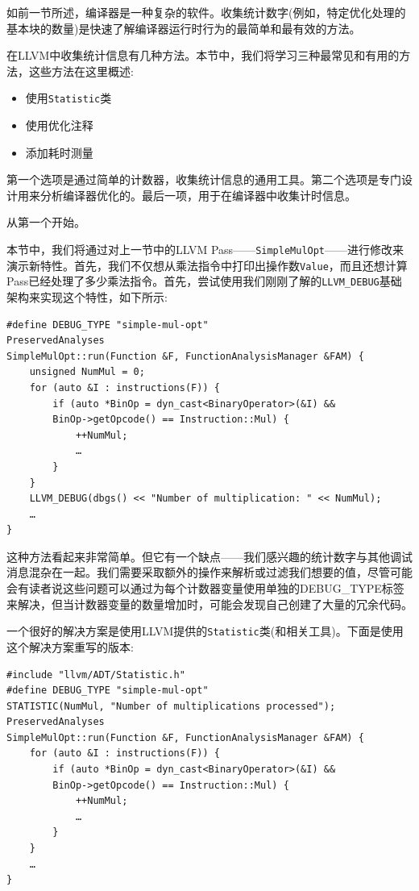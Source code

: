 
如前一节所述，编译器是一种复杂的软件。收集统计数字(例如，特定优化处理的基本块的数量)是快速了解编译器运行时行为的最简单和最有效的方法。

在LLVM中收集统计信息有几种方法。本节中，我们将学习三种最常见和有用的方法，这些方法在这里概述:

\begin{itemize}
\item 使用\texttt{Statistic}类
\item 使用优化注释
\item 添加耗时测量
\end{itemize}

第一个选项是通过简单的计数器，收集统计信息的通用工具。第二个选项是专门设计用来分析编译器优化的。最后一项，用于在编译器中收集计时信息。

从第一个开始。


本节中，我们将通过对上一节中的LLVM Pass——\texttt{SimpleMulOpt}——进行修改来演示新特性。首先，我们不仅想从乘法指令中打印出操作数\texttt{Value}，而且还想计算Pass已经处理了多少乘法指令。首先，尝试使用我们刚刚了解的\texttt{LLVM\_DEBUG}基础架构来实现这个特性，如下所示:

\begin{lstlisting}[style=styleCXX]
#define DEBUG_TYPE "simple-mul-opt"
PreservedAnalyses
SimpleMulOpt::run(Function &F, FunctionAnalysisManager &FAM) {
	unsigned NumMul = 0;
	for (auto &I : instructions(F)) {
		if (auto *BinOp = dyn_cast<BinaryOperator>(&I) &&
		BinOp->getOpcode() == Instruction::Mul) {
			++NumMul;
			…
		}
	}
	LLVM_DEBUG(dbgs() << "Number of multiplication: " << NumMul);
	…
}
\end{lstlisting}

这种方法看起来非常简单。但它有一个缺点——我们感兴趣的统计数字与其他调试消息混杂在一起。我们需要采取额外的操作来解析或过滤我们想要的值，尽管可能会有读者说这些问题可以通过为每个计数器变量使用单独的DEBUG\_TYPE标签来解决，但当计数器变量的数量增加时，可能会发现自己创建了大量的冗余代码。

一个很好的解决方案是使用LLVM提供的\texttt{Statistic}类(和相关工具)。下面是使用这个解决方案重写的版本:

\begin{lstlisting}[style=styleCXX]
#include "llvm/ADT/Statistic.h"
#define DEBUG_TYPE "simple-mul-opt"
STATISTIC(NumMul, "Number of multiplications processed");
PreservedAnalyses
SimpleMulOpt::run(Function &F, FunctionAnalysisManager &FAM) {
	for (auto &I : instructions(F)) {
		if (auto *BinOp = dyn_cast<BinaryOperator>(&I) &&
		BinOp->getOpcode() == Instruction::Mul) {
			++NumMul;
			…
		}
	}
	…
}
\end{lstlisting}

